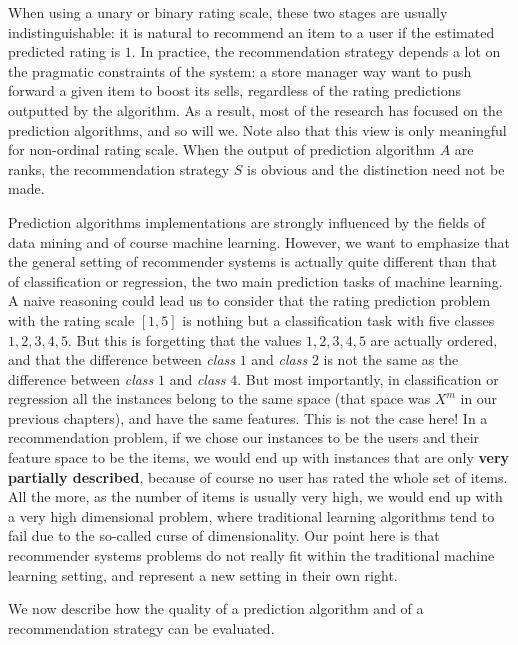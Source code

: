 When using a unary or binary rating scale, these two stages are usually
indistinguishable: it is natural to recommend an item to a user if the
estimated predicted rating is $1$. In practice, the recommendation strategy
depends a lot on the pragmatic constraints of the system: a store manager way
want to push forward a given item to boost its sells, regardless of the
rating predictions outputted by the algorithm. As a result, most of the
research has focused on the prediction algorithms, and so will we. Note also
that this view is only meaningful for non-ordinal rating scale. When the output
of prediction algorithm $A$ are ranks, the recommendation strategy $S$ is
obvious and the distinction need not be made.

Prediction algorithms implementations are strongly influenced by the fields of
data mining and of course machine learning. However, we want to emphasize that
the general setting of recommender systems is actually quite different than
that of classification or regression, the two main prediction tasks of machine
learning. A naive reasoning could lead us to consider that the rating
prediction problem with the rating scale $[1, 5]$ is nothing but a
classification task with five classes $1, 2, 3, 4, 5$. But this is forgetting
that the values $1, 2, 3, 4, 5$ are actually ordered, and that the difference
between \textit{class} $1$ and \textit{class} $2$ is not the same as the
difference between \textit{class} $1$ and \textit{class} $4$. But most
importantly, in classification or regression all the instances belong to the
same space (that space was $X^m$ in our previous chapters), and have the same
features. This is not the case here! In a recommendation problem, if we chose
our instances to be the users and their feature space to be the items, we would
end up with instances that are only \textbf{very partially described}, because of
course no user has rated the whole set of items. All the more, as the number of
items is usually very high, we would end up with a very high dimensional
problem, where traditional learning algorithms tend to fail due to the
so-called curse of dimensionality. Our point here is that recommender systems
problems do not really fit within the traditional machine learning setting, and
represent a new setting in their own right.

We now describe how the quality of a prediction algorithm and of a
recommendation strategy can be evaluated.

